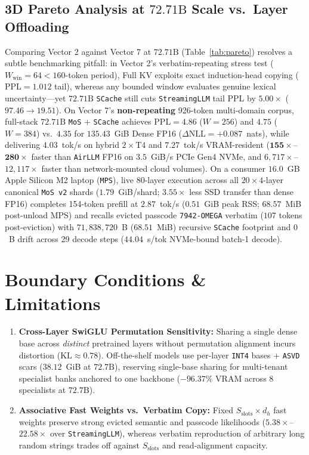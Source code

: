 \documentclass[10pt,twocolumn]{article}
\begin{document}
\subsection{3D Pareto Analysis at $72.71\text{B}$ Scale vs.\ Layer Offloading}
Comparing Vector 2 against Vector 7 at $72.71\text{B}$ (Table~\ref{tab:pareto}) resolves a subtle benchmarking pitfall: in Vector 2's verbatim-repeating stress test ($W_{\text{win}}=64 < 160$-token period), Full KV exploits exact induction-head copying ($\mathrm{PPL}=1.012$ tail), whereas any bounded window evaluates genuine lexical uncertainty---yet $72.71\text{B}$ \texttt{SCache} still cuts \texttt{StreamingLLM} tail PPL by $\mathbf{5.00\times}$ ($97.46 \to 19.51$). On Vector 7's \textbf{non-repeating} 926-token multi-domain corpus, full-stack $72.71\text{B}$ \texttt{MoS} + \texttt{SCache} achieves $\mathrm{PPL}=\mathbf{4.86}$ ($W=256$) and $\mathbf{4.75}$ ($W=384$) vs.\ $\mathbf{4.35}$ for $135.43$~GiB Dense FP16 ($\Delta\text{NLL} = +0.087$~nats), while delivering $4.03$~tok/s on hybrid $2\times\text{T4}$ and $7.27$~tok/s VRAM-resident ($\mathbf{155\times}$--$\mathbf{280\times}$ faster than \texttt{AirLLM} FP16 on $3.5$~GiB/s PCIe Gen4 NVMe, and $6{,}717\times$--$12{,}117\times$ faster than network-mounted cloud volumes). On a consumer $16.0$~GB Apple Silicon M2 laptop (\texttt{MPS}), live 80-layer execution across all $20 \times 4$-layer canonical \texttt{MoS v2} shards ($1.79$~GiB/shard; $3.55\times$ less SSD transfer than dense FP16) completes 154-token prefill at $2.87$~tok/s ($0.51$~GiB peak RSS; $68.57$~MiB post-unload MPS) and recalls evicted passcode \texttt{7942-OMEGA} verbatim ($107$ tokens post-eviction) with $71{,}838{,}720$~B ($68.51$~MiB) recursive \texttt{SCache} footprint and $0$~B drift across 29 decode steps ($44.04$~s/tok NVMe-bound batch-1 decode).

\section{Boundary Conditions \& Limitations}
\begin{enumerate}
    \item \textbf{Cross-Layer SwiGLU Permutation Sensitivity:} Sharing a single dense base across \emph{distinct} pretrained layers without permutation alignment incurs distortion ($\mathrm{KL} \approx 0.78$). Off-the-shelf models use per-layer \texttt{INT4} bases + \texttt{ASVD} scars ($38.12$~GiB at $72.7\text{B}$), reserving single-base sharing for multi-tenant specialist banks anchored to one backbone ($-96.37\%$ VRAM across 8 specialists at $72.7\text{B}$).
    \item \textbf{Associative Fast Weights vs.\ Verbatim Copy:} Fixed $S_{\text{slots}} \times d_h$ fast weights preserve strong evicted semantic and passcode likelihoods ($5.38\times$--$22.58\times$ over \texttt{StreamingLLM}), whereas verbatim reproduction of arbitrary long random strings trades off against $S_{\text{slots}}$ and read-alignment capacity.
\end{enumerate}
\end{document}
